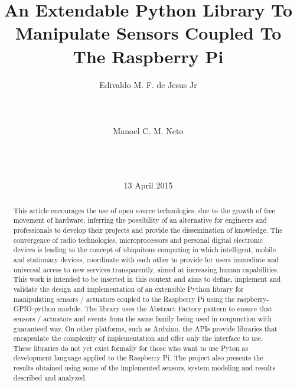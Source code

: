 \documentclass{acm_proc_article-sp}
\begin{document}
\title{An Extendable Python Library To Manipulate Sensors Coupled To The Raspberry Pi}

\author{
\alignauthor
Edivaldo M. F. de Jesus Jr\\
       \\
       \\
       \\
\alignauthor
Manoel C. M. Neto\\
       \\
       \\
       \\
}

\date{13 April 2015}

\maketitle
\begin{abstract}

This article encourages the use of open source technologies, due to the growth of free movement of hardware, inferring the possibility of an alternative for engineers and professionals to develop their projects and provide the dissemination of knowledge.
The convergence of radio technologies, microprocessors and personal digital electronic devices is leading to the concept of ubiquitous computing in which intelligent, mobile and stationary devices, coordinate with each other to provide for users immediate and universal access to new services transparently, aimed at increasing human capabilities. This work is intended to be inserted in this context and aims to define, implement and validate the design and implementation of an extensible Python library for manipulating sensors / actuators coupled to the Raspberry Pi using the raspberry-GPIO-python module. The library uses the Abstract Factory pattern to ensure that sensors / actuators and events from the same family being used in conjunction with guaranteed way. On other platforms, such as Arduino, the APIs provide libraries that encapsulate the complexity of implementation and offer only the interface to use. These libraries do not yet exist formally for those who want to use Pyton as development language applied to the Raspberry Pi.  The project also presents the results obtained using some of the implemented sensors, system modeling and results described and analyzed.

\end{abstract}
\end{document}
